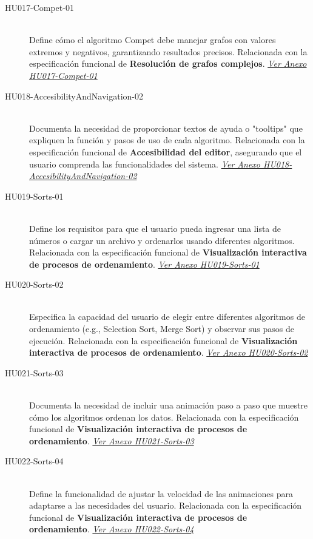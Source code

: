 \documentclass[stu, 12pt, letterpaper, donotrepeattitle, floatsintext, natbib]{apa7}
\begin{document}
\begin{description}
    \item[HU017-Compet-01] \hfill \\
    Define cómo el algoritmo Compet debe manejar grafos con valores extremos y negativos, garantizando resultados precisos. Relacionada con la especificación funcional de \textbf{Resolución de grafos complejos}. \textit{\hyperref[tab:HU017-Compet-01]{Ver Anexo HU017-Compet-01}}

    \item[HU018-AccesibilityAndNavigation-02] \hfill \\
    Documenta la necesidad de proporcionar textos de ayuda o "tooltips" que expliquen la función y pasos de uso de cada algoritmo. Relacionada con la especificación funcional de \textbf{Accesibilidad del editor}, asegurando que el usuario comprenda las funcionalidades del sistema. \textit{\hyperref[tab:HU018-AccesibilityAndNavigation-02]{Ver Anexo HU018-AccesibilityAndNavigation-02}}

    \item[HU019-Sorts-01] \hfill \\
    Define los requisitos para que el usuario pueda ingresar una lista de números o cargar un archivo y ordenarlos usando diferentes algoritmos. Relacionada con la especificación funcional de \textbf{Visualización interactiva de procesos de ordenamiento}. \textit{\hyperref[tab:HU019-Sorts-01]{Ver Anexo HU019-Sorts-01}}

    \item[HU020-Sorts-02] \hfill \\
    Especifica la capacidad del usuario de elegir entre diferentes algoritmos de ordenamiento (e.g., Selection Sort, Merge Sort) y observar sus pasos de ejecución. Relacionada con la especificación funcional de \textbf{Visualización interactiva de procesos de ordenamiento}. \textit{\hyperref[tab:HU020-Sorts-02]{Ver Anexo HU020-Sorts-02}}

    \item[HU021-Sorts-03] \hfill \\
    Documenta la necesidad de incluir una animación paso a paso que muestre cómo los algoritmos ordenan los datos. Relacionada con la especificación funcional de \textbf{Visualización interactiva de procesos de ordenamiento}. \textit{\hyperref[tab:HU021-Sorts-03]{Ver Anexo HU021-Sorts-03}}

    \item[HU022-Sorts-04] \hfill \\
    Define la funcionalidad de ajustar la velocidad de las animaciones para adaptarse a las necesidades del usuario. Relacionada con la especificación funcional de \textbf{Visualización interactiva de procesos de ordenamiento}. \textit{\hyperref[tab:HU022-Sorts-04]{Ver Anexo HU022-Sorts-04}}


\end{description}
\end{document}
